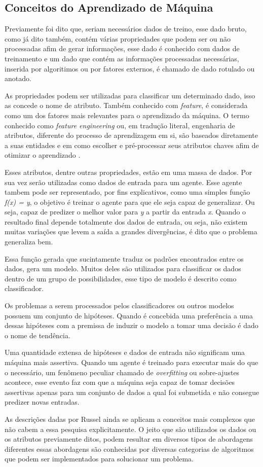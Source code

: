 \subsection{Conceitos do Aprendizado de Máquina}
Previamente foi dito que, seriam necessários dados de treino, esse dado bruto, como já dito também, contém várias propriedades que podem ser ou não processadas afim de gerar informações, esse dado é conhecido com dados de treinamento e um dado que contém as informações processadas necessárias, inserida por algoritimos ou por fatores externos, é chamado de dado rotulado ou anotado.

As propriedades podem ser utilizadas para classificar um determinado dado, isso as concede o nome de atributo. Também conhecido com \textit{feature}, é considerada como um dos fatores mais relevantes para o aprendizado da máquina. O termo conhecido como \textit{feature engineering} ou, em tradução literal, engenharia de atributos, diferente do processo de aprendizagem em si, são baseados diretamente a suas entidades e em como escolher e pré-processar seus atributos chaves afim de otimizar o aprendizado \cite{domingos2012few}.

Esses atributos, dentre outras propriedades, estão em uma massa de dados. Por sua vez serão utilizadas como dados de entrada para um agente. Esse agente tambem pode ser representado, por fins explicativos, como uma simples função \textit{f(x) = y}, o objetivo é treinar o agente para que ele seja capaz de generalizar. Ou seja, capaz de predizer o melhor valor para \textit{y} a partir da entrada \textit{x}. Quando o resultado final depende totalmente dos dados de entrada, ou seja, não existem muitas variações que levem a saída a grandes divergências, é dito que o problema generaliza bem.

Essa função gerada que sucintamente traduz os padrões encontrados entre os dados, gera um modelo. Muitos deles são utilizados para classificar os dados dentro de um grupo de possibilidades, esse tipo de modelo é descrito como classificador.

Os problemas a serem processados pelos classificadores ou outros modelos possuem um conjunto de  hipóteses. Quando é concebida uma preferência a uma dessas hipóteses com a premissa de induzir o modelo a tomar uma decisão é dado o nome de tendência.

Uma quantidade extensa de hipóteses e dados de entrada não significam uma máquina mais assertiva. Quando um agente é treinado para executar mais do que o necessário, um fenômeno peculiar chamado de \textit{overfitting} ou sobre-ajustes acontece, esse evento faz com que a máquina seja capaz de tomar decisões assertivas apenas para um conjunto de dados a qual foi submetida e não consegue predizer novas entradas.

As descrições dadas por Russel \cite[693]{russell2003artificial} ainda se aplicam a conceitos mais complexos que não cabem a essa pesquisa explicitamente. O jeito que são utilizados os dados ou os atributos previamente ditos, podem resultar em diversos tipos de abordagens diferentes essas abordagens são conhecidas por diversas categorias de algoritmos que podem ser implementados para solucionar um problema.

